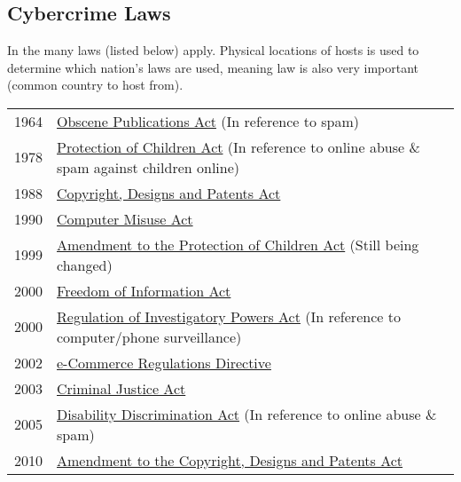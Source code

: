 \documentclass{report}
\begin{document}
\subsection*{Cybercrime Laws}
In the  many laws (listed below) apply. Physical locations of hosts is used to determine which nation's laws are used, meaning  law is also very important (common country to host from).
\begin{center}
	\begin{tabular}{l l}
		1964 & \href{https://www.legislation.gov.uk/ukpga/1964/74/contents}{Obscene Publications Act} (In reference to spam)                                           \\
		1978 & \href{https://www.legislation.gov.uk/ukpga/1978/37/contents}{Protection of Children Act} (In reference to online abuse \& spam against children online) \\
		1988 & \href{https://www.legislation.gov.uk/ukpga/1988/48/contents}{Copyright, Designs and Patents Act}                                                        \\
		1990 & \href{https://www.legislation.gov.uk/ukpga/1990/18/contents}{Computer Misuse Act}                                                                       \\
		1999 & \href{https://www.legislation.gov.uk/ukpga/1999/14/contents}{Amendment to the Protection of Children Act} (Still being changed)                         \\
		2000 & \href{https://www.legislation.gov.uk/ukpga/2000/36/contents}{Freedom of Information Act}                                                                \\
		2000 & \href{https://www.legislation.gov.uk/ukpga/2000/23/contents}{Regulation of Investigatory Powers Act} (In reference to computer/phone surveillance)      \\
		2002 & \href{https://www.legislation.gov.uk/uksi/2002/2013/made}{e-Commerce Regulations Directive}                                                             \\
		2003 & \href{https://www.legislation.gov.uk/ukpga/2003/44/contents}{Criminal Justice Act}                                                                      \\
		2005 & \href{https://www.legislation.gov.uk/ukpga/2005/13/contents}{Disability Discrimination Act} (In reference to online abuse \& spam)                      \\
		2010 & \href{https://www.legislation.gov.uk/uksi/2010/2694/contents/made}{Amendment to the Copyright, Designs and Patents Act}                                 \\

\end{tabular}
\end{center}
\end{document}
